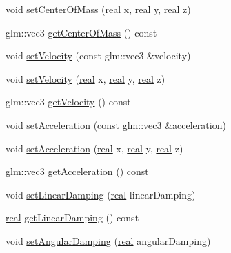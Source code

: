 \begin{DoxyCompactItemize}
\item 
void \mbox{\hyperlink{classrum_1_1_rigid_body_a983c67327b420e87c1c9f8d1fd29d68d}{set\+Center\+Of\+Mass}} (\mbox{\hyperlink{namespacerum_a7e8cca23573d5eaead0f138cbaa4862c}{real}} x, \mbox{\hyperlink{namespacerum_a7e8cca23573d5eaead0f138cbaa4862c}{real}} y, \mbox{\hyperlink{namespacerum_a7e8cca23573d5eaead0f138cbaa4862c}{real}} z)
\item 
glm\+::vec3 \mbox{\hyperlink{classrum_1_1_rigid_body_ab570c04bca7673a3e80286a71f7bfa76}{get\+Center\+Of\+Mass}} () const
\item 
void \mbox{\hyperlink{classrum_1_1_rigid_body_a807a0309fef97be32db6f1e981e2f029}{set\+Velocity}} (const glm\+::vec3 \&velocity)
\item 
void \mbox{\hyperlink{classrum_1_1_rigid_body_abca9a7836044d66793a26584a06cf58b}{set\+Velocity}} (\mbox{\hyperlink{namespacerum_a7e8cca23573d5eaead0f138cbaa4862c}{real}} x, \mbox{\hyperlink{namespacerum_a7e8cca23573d5eaead0f138cbaa4862c}{real}} y, \mbox{\hyperlink{namespacerum_a7e8cca23573d5eaead0f138cbaa4862c}{real}} z)
\item 
glm\+::vec3 \mbox{\hyperlink{classrum_1_1_rigid_body_a4e321b456c54e8090e1c897d513829f9}{get\+Velocity}} () const
\item 
void \mbox{\hyperlink{classrum_1_1_rigid_body_a217a8370a7196e29e2e02fa57cde9bb4}{set\+Acceleration}} (const glm\+::vec3 \&acceleration)
\item 
void \mbox{\hyperlink{classrum_1_1_rigid_body_a01f23f1951a646cbc534f4d5742f9ec0}{set\+Acceleration}} (\mbox{\hyperlink{namespacerum_a7e8cca23573d5eaead0f138cbaa4862c}{real}} x, \mbox{\hyperlink{namespacerum_a7e8cca23573d5eaead0f138cbaa4862c}{real}} y, \mbox{\hyperlink{namespacerum_a7e8cca23573d5eaead0f138cbaa4862c}{real}} z)
\item 
glm\+::vec3 \mbox{\hyperlink{classrum_1_1_rigid_body_a8b303ca817b107348692e5b442ae7a56}{get\+Acceleration}} () const
\item 
void \mbox{\hyperlink{classrum_1_1_rigid_body_a95cdc17498c69170c32231fb35ba4cdd}{set\+Linear\+Damping}} (\mbox{\hyperlink{namespacerum_a7e8cca23573d5eaead0f138cbaa4862c}{real}} linear\+Damping)
\item 
\mbox{\hyperlink{namespacerum_a7e8cca23573d5eaead0f138cbaa4862c}{real}} \mbox{\hyperlink{classrum_1_1_rigid_body_a637e50a502427fdd128873a015e84997}{get\+Linear\+Damping}} () const
\item 
void \mbox{\hyperlink{classrum_1_1_rigid_body_a5eb02440283b3dc6ebd7e2afbf769614}{set\+Angular\+Damping}} (\mbox{\hyperlink{namespacerum_a7e8cca23573d5eaead0f138cbaa4862c}{real}} angular\+Damping)

\end{DoxyCompactItemize}
